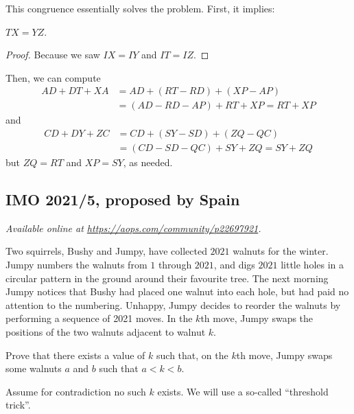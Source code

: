 \documentclass[11pt]{scrartcl}
\begin{document}
This congruence essentially solves the problem.
First, it implies:
\begin{claim*}
  $TX = YZ$.
\end{claim*}
\begin{proof}
  Because we saw $IX = IY$ and $IT = IZ$.
\end{proof}
Then, we can compute
\begin{align*}
  AD + DT + XA
  &= AD + (RT - RD) + (XP-AP) \\
  &= (AD-RD-AP) + RT + XP = RT + XP
\end{align*}
and
\begin{align*}
  CD + DY + ZC &= CD + (SY-SD) + (ZQ-QC) \\
  &= (CD-SD-QC) + SY + ZQ = SY + ZQ
\end{align*}
but $ZQ = RT$ and $XP = SY$, as needed.
\pagebreak

\subsection{IMO 2021/5, proposed by Spain}
\textsl{Available online at \url{https://aops.com/community/p22697921}.}
\begin{mdframed}[style=mdpurplebox,frametitle={Problem statement}]
Two squirrels, Bushy and Jumpy, have collected $2021$ walnuts for the winter.
Jumpy numbers the walnuts from $1$ through $2021$, and digs $2021$ little holes
in a circular pattern in the ground around their favourite tree.
The next morning Jumpy notices that Bushy had placed one walnut into each hole,
but had paid no attention to the numbering.
Unhappy, Jumpy decides to reorder the walnuts by performing a sequence of 2021 moves.
In the $k$th move, Jumpy swaps the positions of the two walnuts adjacent to walnut $k$.

Prove that there exists a value of $k$ such that, on the $k$th move,
Jumpy swaps some walnuts $a$ and $b$ such that $a<k<b$.
\end{mdframed}
Assume for contradiction no such $k$ exists.
We will use a so-called ``threshold trick''.
\end{document}
